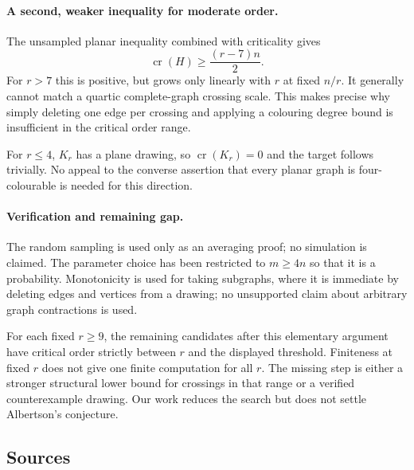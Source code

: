 \documentclass[11pt,a4paper]{article}
\begin{document}
\paragraph{A second, weaker inequality for moderate order.}
The unsampled planar inequality combined with criticality gives
\[
\operatorname{cr}(H)\ge \frac{(r-7)n}{2}.
\]
For $r>7$ this is positive, but grows only linearly with $r$ at fixed $n/r$. It generally cannot match a quartic complete-graph crossing scale. This makes precise why simply deleting one edge per crossing and applying a colouring degree bound is insufficient in the critical order range.

For $r\le4$, $K_r$ has a plane drawing, so $\operatorname{cr}(K_r)=0$ and the target follows trivially. No appeal to the converse assertion that every planar graph is four-colourable is needed for this direction.

\paragraph{Verification and remaining gap.}
The random sampling is used only as an averaging proof; no simulation is claimed. The parameter choice has been restricted to $m\ge4n$ so that it is a probability. Monotonicity is used for taking subgraphs, where it is immediate by deleting edges and vertices from a drawing; no unsupported claim about arbitrary graph contractions is used.

For each fixed $r\ge9$, the remaining candidates after this elementary argument have critical order strictly between $r$ and the displayed threshold. Finiteness at fixed $r$ does not give one finite computation for all $r$. The missing step is either a stronger structural lower bound for crossings in that range or a verified counterexample drawing. Our work reduces the search but does not settle Albertson's conjecture.

\subsection{Sources}
\end{document}
